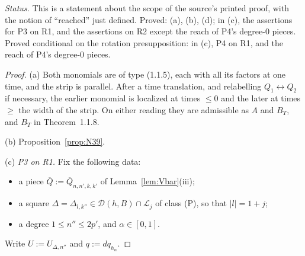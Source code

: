 \documentclass[11pt,a4paper]{article}
\theoremstyle{plain}
\theoremstyle{definition}
\begin{document}
\emph{Status.}  This is a statement about the scope of the source's printed proof, with the notion
of ``reached'' just defined.  Proved: (a), (b), (d); in (c), the assertions for P3 on R1, and
the assertions on R2 except the reach of P4's degree-$0$ pieces.  Proved conditional on the
rotation presupposition: in (c), P4 on R1, and the reach of P4's degree-$0$ pieces.

\begin{proof}
(a) Both monomials are of type (1.1.5), each with all its factors at one time, and the strip is
parallel.  After a time translation, and relabelling $Q_1\leftrightarrow Q_2$ if necessary, the
earlier monomial is localized at times $\le0$ and the later at times $\ge$ the width of the strip.
On either reading they are admissible as $A$ and $B_T$, and $B_T$ in Theorem~1.1.8.

(b) Proposition~\ref{prop:N39}.

(c) \emph{P3 on R1.}  Fix the following data:
\begin{itemize}
\item a piece $\overline Q:=\overline Q_{n,n',k,k'}$ of Lemma~\ref{lem:Vbar}(iii);
\item a square $\Delta=\Delta_{l,k''}\in\mathcal D(h,B)\cap\mathcal L_j$ of class (P), so that
$|l|=1+j$;
\item a degree $1\le n''\le2p'$, and $\alpha\in[0,1]$.
\end{itemize}
Write $U:=U_{\Delta,n''}$ and $q:=dq_{h_\alpha}$.


\end{proof}
\end{document}

